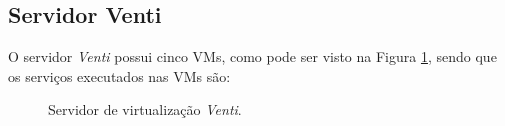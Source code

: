 \subsection{Servidor Venti}
\label{section:serv_venti}

O servidor \textit{Venti} possui cinco \acp{VM}, como pode ser visto na Figura \ref{fig:servidor_venti}, sendo que os serviços executados nas 
\acp{VM} são:

\begin{figure}[h!]
 \centering
 \caption{Servidor de virtualização \textit{Venti}.}
 \label{fig:servidor_venti}
\end{figure}

